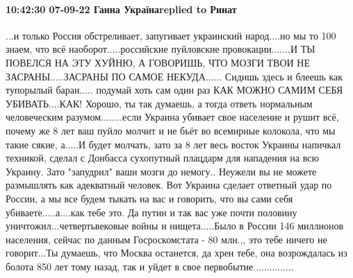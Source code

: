 \paragraph{10:42:30 07-09-22 Ганна Українаreplied to Ринат}

...и только Россия обстреливает, запугивает украинский народ....но мы то 100%
знаем, что всё наоборот.....российские пуйловские провокации.......И ТЫ ПОВЕЛСЯ
НА ЭТУ ХУЙНЮ, А ГОВОРИШЬ, ЧТО МОЗГИ ТВОИ НЕ ЗАСРАНЫ.....ЗАСРАНЫ ПО САМОЕ
НЕКУДА...... Сидишь здесь и блеешь как тупорылый баран..... подумай хоть сам
один раз КАК МОЖНО САМИМ СЕБЯ УБИВАТЬ....КАК! Хорошо, ты так думаешь, а тогда
ответь нормальным человеческим разумом........если Украина убивает свое
население и рушит всё, почему же 8 лет ваш пуйло молчит и не бьёт во всемирные
колокола, что мы такие сякие, а.....И будет молчать, зато за 8 лет весь восток
Украины напичкал техникой, сделал с Донбасса сухопутный плацдарм для нападения
на всю Украину. Зато "запудрил" ваши мозги до немогу.. Неужели вы не можете
размышлять как адекватный человек. Вот Украина сделает ответный удар по России,
а мы все будем тыкать на вас и говорить, что вы сами себя убиваете.....а....как
тебе это. Да путин и так вас уже почти половину уничтожил...четвертьвековые
войны и нищета.....Было в России 146 миллионов населения, сейчас по данным
Госроскомстата - 80 млн.,, это тебе ничего не говорит...Ты думаешь, что Москва
останется, да хрен тебе, она возрождалась из болота 850 лет тому назад, так и
уйдет в свое первобытие...............

